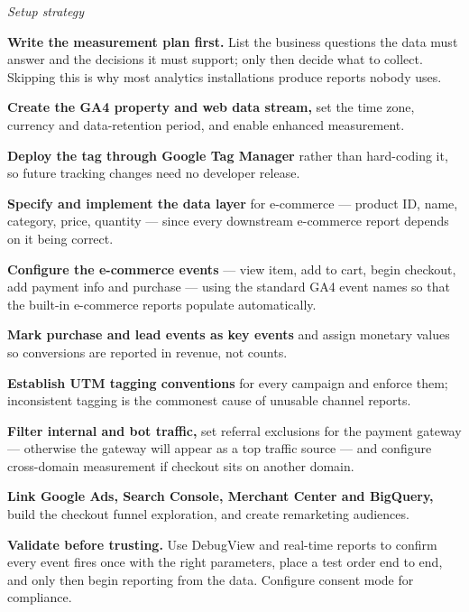 \begin{qlist}
\textit{Setup strategy}
\begin{apts}
\item \textbf{Write the measurement plan first.} List the business questions the
      data must answer and the decisions it must support; only then decide what
      to collect. Skipping this is why most analytics installations produce
      reports nobody uses.
\item \textbf{Create the GA4 property and web data stream,} set the time zone,
      currency and data-retention period, and enable enhanced measurement.
\item \textbf{Deploy the tag through Google Tag Manager} rather than hard-coding
      it, so future tracking changes need no developer release.
\item \textbf{Specify and implement the data layer} for e-commerce --- product
      ID, name, category, price, quantity --- since every downstream e-commerce
      report depends on it being correct.
\item \textbf{Configure the e-commerce events} --- view item, add to cart,
      begin checkout, add payment info and purchase --- using the standard GA4
      event names so that the built-in e-commerce reports populate
      automatically.
\item \textbf{Mark purchase and lead events as key events} and assign monetary
      values so conversions are reported in revenue, not counts.
\item \textbf{Establish UTM tagging conventions} for every campaign and enforce
      them; inconsistent tagging is the commonest cause of unusable channel
      reports.
\item \textbf{Filter internal and bot traffic,} set referral exclusions for the
      payment gateway --- otherwise the gateway will appear as a top traffic
      source --- and configure cross-domain measurement if checkout sits on
      another domain.
\item \textbf{Link Google Ads, Search Console, Merchant Center and BigQuery,}
      build the checkout funnel exploration, and create remarketing audiences.
\item \textbf{Validate before trusting.} Use DebugView and real-time reports to
      confirm every event fires once with the right parameters, place a test
      order end to end, and only then begin reporting from the data. Configure
      consent mode for compliance.
\end{apts}


\end{qlist}
